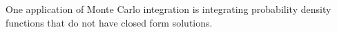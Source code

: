 One application of Monte Carlo integration is integrating probability density functions that do not have closed form solutions.


